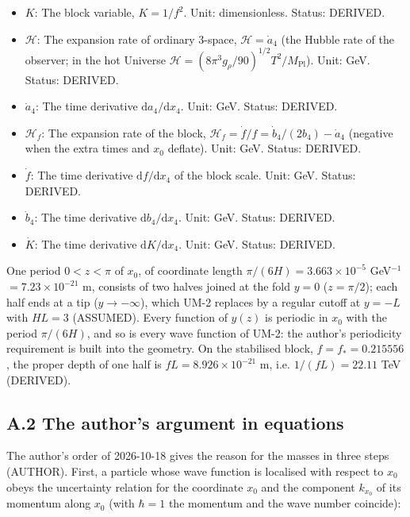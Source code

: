 \documentclass[
  10pt,
]{article}
\begin{document}
\begin{itemize}
\item
  \(K\): The block variable, \(K = 1/f^2\). Unit: dimensionless. Status:
  DERIVED.
\item
  \(\mathcal{H}\): The expansion rate of ordinary 3-space,
  \(\mathcal{H} = \dot a_4\) (the Hubble rate of the observer; in the
  hot Universe
  \(\mathcal{H} = (8\pi^3g_\rho/90)^{1/2}T^2/M_{\mathrm{Pl}}\)). Unit:
  GeV. Status: DERIVED.
\item
  \(\dot a_4\): The time derivative \(\mathrm{d}a_4/\mathrm{d}x_4\).
  Unit: GeV. Status: DERIVED.
\item
  \(\mathcal{H}_f\): The expansion rate of the block,
  \(\mathcal{H}_f = \dot f/f = \dot b_4/(2b_4) - \dot a_4\) (negative
  when the extra times and \(x_0\) deflate). Unit: GeV. Status: DERIVED.
\item
  \(\dot f\): The time derivative \(\mathrm{d}f/\mathrm{d}x_4\) of the
  block scale. Unit: GeV. Status: DERIVED.
\item
  \(\dot b_4\): The time derivative \(\mathrm{d}b_4/\mathrm{d}x_4\).
  Unit: GeV. Status: DERIVED.
\item
  \(\dot K\): The time derivative \(\mathrm{d}K/\mathrm{d}x_4\). Unit:
  GeV. Status: DERIVED.
\end{itemize}

One period \(0 < z < \pi\) of \(x_0\), of coordinate length
\(\pi/(6H) = 3.663\times10^{-5}\) GeV\(^{-1}\) \(= 7.23\times10^{-21}\)
m, consists of two halves joined at the fold \(y = 0\) (\(z = \pi/2\));
each half ends at a tip (\(y \to -\infty\)), which UM-2 replaces by a
regular cutoff at \(y = -L\) with \(HL = 3\) (ASSUMED). Every function
of \(y(z)\) is periodic in \(x_0\) with the period \(\pi/(6H)\), and so
is every wave function of UM-2: the author's periodicity requirement is
built into the geometry. On the stabilised block,
\(f = f_* = 0.215556\), the proper depth of one half is
\(fL = 8.926\times10^{-21}\) m, i.e. \(1/(fL) = 22.11\) TeV (DERIVED).

\hypertarget{a.2-the-authors-argument-in-equations}{%
\subsection*{A.2 The author's argument in
equations}\label{a.2-the-authors-argument-in-equations}}

The author's order of 2026-10-18 gives the reason for the masses in
three steps (AUTHOR). First, a particle whose wave function is localised
with respect to \(x_0\) obeys the uncertainty relation for the
coordinate \(x_0\) and the component \(k_{x_0}\) of its momentum along
\(x_0\) (with \(\hbar = 1\) the momentum and the wave number coincide):
\end{document}
